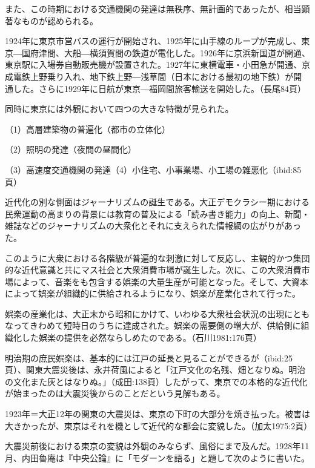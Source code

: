 また、この時期における交通機関の発達は無秩序、無計画的であったが、相当顕著なものが認められる。

1924年に東京市営バスの運行が開始され、1925年に山手線のループが完成し、東京―国府津間、大船―横須賀間の鉄道が電化した。1926年に京浜新国道が開通、東京駅に入場券自動販売機が設置された。1927年に東横電車・小田急が開通、京成電鉄上野乗り入れ、地下鉄上野―浅草間（日本における最初の地下鉄）が開通した。さらに1929年に日航が東京―福岡間旅客輸送を開始した。（長尾84頁）

同時に東京には外観において四つの大きな特徴が見られた。

（1）高層建築物の普遍化（都市の立体化）

（2）照明の発達（夜間の昼間化）

（3）高速度交通機関の発達（4）小住宅、小事業場、小工場の雑悪化（ibid:85頁）

近代化の別な側面はジャーナリズムの誕生である。大正デモクラシー期における民衆運動の高まりの背景には教育の普及による「読み書き能力」の向上、新聞・雑誌などのジャーナリズムの大衆化とそれに支えられた情報網の広がりがあった。

このように大衆における各階級が普遍的な刺激に対して反応し、主観的かつ集団的な近代意識と共にマス社会と大衆消費市場が誕生した。次に、この大衆消費市場によって、音楽をも包含する娯楽の大量生産が可能となった。そして、大資本によって娯楽が組織的に供給されるようになり、娯楽が産業化されて行った。

\begin{gquote}
娯楽の産業化は、大正末から昭和にかけて、いわゆる大衆社会状況の出現にともなってきわめて短時日のうちに達成された。娯楽の需要側の増大が、供給側に組織化した娯楽の提供を必然ならしめたのである。（石川1981:176頁）
\end{gquote}

明治期の庶民娯楽は、基本的には江戸の延長と見ることができるが（ibid:25頁）、関東大震災後は、永井荷風によると「江戸文化の名残、畑となりぬ。明治の文化また灰とはなりぬ。」（成田:138頁）したがって、東京での本格的な近代化が始まったのは大震災後からのことだという見解もある。

\begin{gquote}
1923年＝大正12年の関東の大震災は、東京の下町の大部分を焼き払った。被害は大きかったが、東京はそれを機として近代的な都会に変貌した。（加太1975:2頁）
\end{gquote}

大震災前後における東京の変貌は外観のみならず、風俗にまで及んだ。1928年11月、内田魯庵は『中央公論』に「モダーンを語る」と題して次のように書いた。

